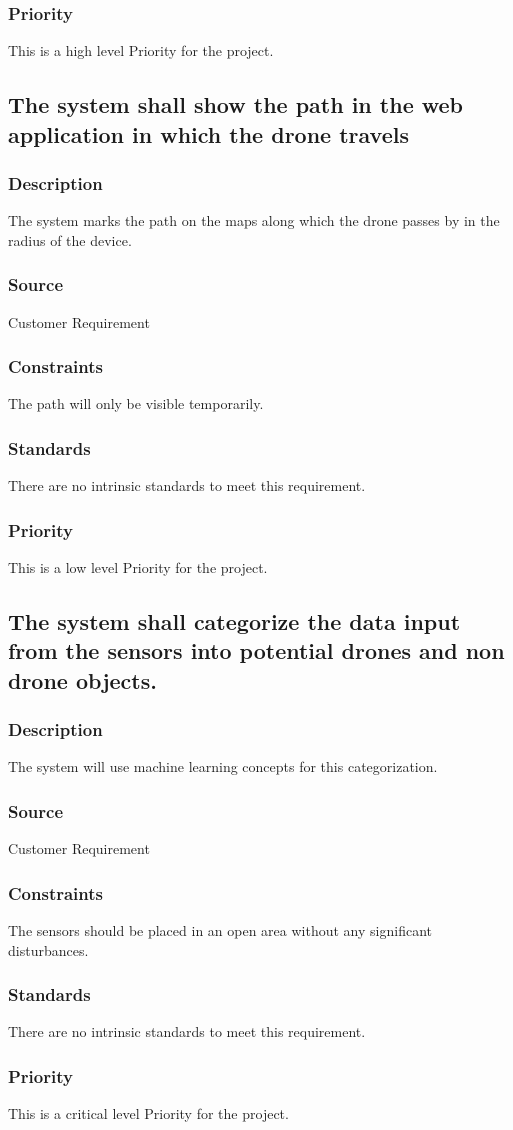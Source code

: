 \subsubsection{Priority}
This is a high level Priority for the project.

\subsection{The system shall show the path in the web application in which the drone travels}
\subsubsection{Description}
The system marks the path on the maps along which the drone passes by in the radius of the device.
\subsubsection{Source}
Customer Requirement
\subsubsection{Constraints}
The path will only be visible temporarily.
\subsubsection{Standards}
There are no intrinsic standards to meet this requirement.
\subsubsection{Priority}
This is a low level Priority for the project.

\subsection{The system shall categorize the data input from the sensors into potential drones and non drone objects.}
\subsubsection{Description}
The system will use machine learning concepts for this categorization.
\subsubsection{Source}
Customer Requirement
\subsubsection{Constraints}
The sensors should be placed in an open area without any significant disturbances.
\subsubsection{Standards}
There are no intrinsic standards to meet this requirement.
\subsubsection{Priority}
This is a critical level Priority for the project.
